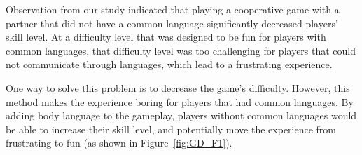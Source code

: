 
Observation from our study indicated that playing a cooperative game with a partner that did not have a common language significantly decreased players' skill level. At a difficulty level that was designed to be fun for players with common languages, that difficulty level was too challenging for players that could not communicate through languages, which lead to a frustrating experience. 

One way to solve this problem is to decrease the game's difficulty. However, this method makes the experience boring for players that had common languages. By adding body language to the gameplay, players without common languages would be able to increase their skill level, and potentially move the experience from frustrating to fun (as shown in Figure~\ref{fig:GD_F1}).  






